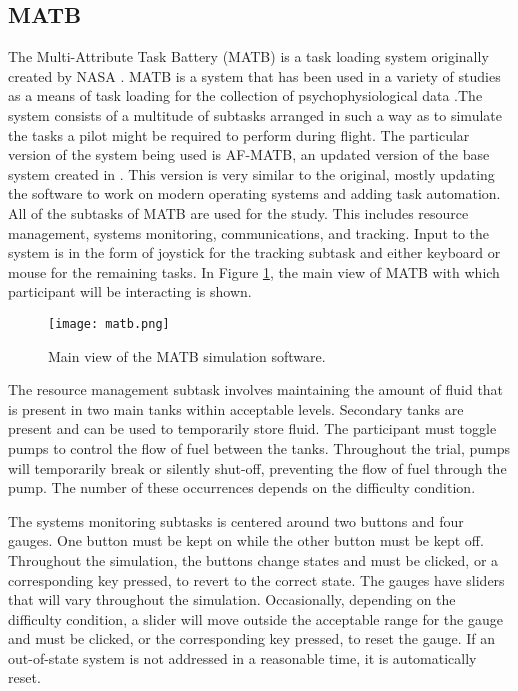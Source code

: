 \documentclass[11pt]{artikel3}
\begin{document}
\subsection{MATB}
The Multi-Attribute Task Battery (MATB) is a task loading system originally created by NASA \cite{Comstock}. MATB is a system that has been used in a variety of studies as a means of task loading for the collection of psychophysiological data \cite{Wilson, Smith, Wang_Z}.The system consists of a multitude of subtasks arranged in such a way as to simulate the tasks a pilot might be required to perform during flight. The particular version of the system being used is AF-MATB, an updated version of the base system created in \cite{Estepp}. This version is very similar to the original, mostly updating the software to work on modern operating systems and adding task automation. All of the subtasks of MATB are used for the study. This includes resource management, systems monitoring, communications, and tracking. Input to the system is in the form of joystick for the tracking subtask and either keyboard or mouse for the remaining tasks. In Figure \ref{fig:matb}, the main view of MATB with which participant will be interacting is shown.

\begin{figure}[p]
    \centering
    \texttt{[image: matb.png]}
    \caption{Main view of the MATB simulation software. }
    \label{fig:matb}
\end{figure}

The resource management subtask involves maintaining the amount of fluid that is present in two main tanks within acceptable levels. Secondary tanks are present and can be used to temporarily store fluid. The participant must toggle pumps to control the flow of fuel between the tanks. Throughout the trial, pumps will temporarily break or silently shut-off, preventing the flow of fuel through the pump. The number of these occurrences depends on the difficulty condition.

The systems monitoring subtasks is centered around two buttons and four gauges. One button must be kept on while the other button must be kept off. Throughout the simulation, the buttons change states and must be clicked, or a corresponding key pressed, to revert to the correct state. The gauges have sliders that will vary throughout the simulation. Occasionally, depending on the difficulty condition, a slider will move outside the acceptable range for the gauge and must be clicked, or the corresponding key pressed, to reset the gauge. If an out-of-state system is not addressed in a reasonable time, it is automatically reset.
\end{document}
